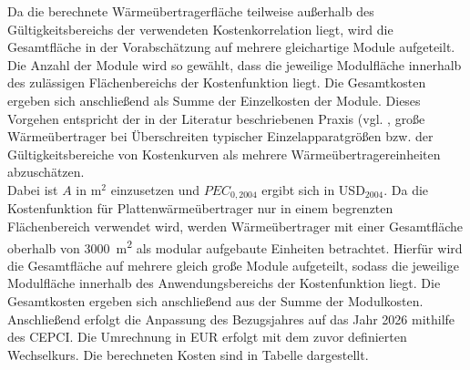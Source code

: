 Da die berechnete Wärmeübertragerfläche teilweise außerhalb des
Gültigkeitsbereichs der verwendeten Kostenkorrelation liegt, wird die
Gesamtfläche in der Vorabschätzung auf mehrere gleichartige Module
aufgeteilt. Die Anzahl der Module wird so gewählt, dass die jeweilige
Modulfläche innerhalb des zulässigen Flächenbereichs der Kostenfunktion liegt. Die Gesamtkosten ergeben sich anschließend als Summe der Einzelkosten der Module. Dieses Vorgehen entspricht der in der Literatur beschriebenen Praxis (vgl. \cite{petersPlantDesignEconomics2004, hewittApproximateDesignCosting2007}, große Wärmeübertrager bei Überschreiten typischer Einzelapparatgrößen bzw. der Gültigkeitsbereiche von Kostenkurven als mehrere Wärmeübertragereinheiten abzuschätzen.\\
Dabei ist $A$ in m$^2$ einzusetzen und $PEC_{0,2004}$ ergibt sich in USD$_{2004}$. Da die Kostenfunktion für Plattenwärmeübertrager nur in einem begrenzten Flächenbereich
verwendet wird, werden Wärmeübertrager mit einer Gesamtfläche oberhalb von
\SI{3000}{m^2} als modular aufgebaute Einheiten betrachtet. Hierfür wird die Gesamtfläche
auf mehrere gleich große Module aufgeteilt, sodass die jeweilige Modulfläche innerhalb des
Anwendungsbereichs der Kostenfunktion liegt. Die Gesamtkosten ergeben sich anschließend
aus der Summe der Modulkosten.\\
Anschließend erfolgt die Anpassung des Bezugsjahres auf das Jahr 2026 mithilfe des
CEPCI. Die Umrechnung in EUR erfolgt mit dem zuvor definierten Wechselkurs. Die berechneten Kosten sind in Tabelle \label{tab:kosten_waermeuebertrager} dargestellt.

